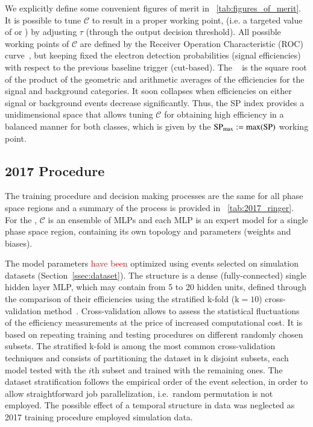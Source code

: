 We explicitly define some convenient figures of merit in \tablename~\ref{tab:figures_of_merit}. It is possible to tune $\mathcal{C}$ to result in a proper working point, (i.e. a targeted value of \pd{} or \pf{}) by adjusting $\tau$ (through the output decision threshold). All possible working points of $\mathcal{C}$ are defined by the Receiver Operation Characteristic (ROC) curve~\cite{van_trees_part1}, but keeping fixed the electron detection probabilities (signal efficiencies) with respect to the previous baseline trigger (cut-based). The \spindex{}~\cite{dos2006neural} is the square root of the product of the geometric and arithmetic averages of the efficiencies for the signal and background categories. It soon collapses when efficiencies on either signal or background events decrease significantly. Thus, the SP index provides a unidimensional space that allows tuning $\mathcal{C}$ for obtaining high efficiency in a balanced manner for both classes, which is given by the $\text{SP}_{\text{max}}{}:=\max(\text{SP}{})$ working point.









\subsection{2017 Procedure}\label{ssec:2017}

The training procedure and decision making processes are the same for all phase
space regions and a summary of the process is provided in
\tablename~\ref{tab:2017_ringer}. For the \rnn{}, $\mathcal{C}$ is an ensemble of
MLPs and each MLP is an expert model for a single phase space
region, containing its own topology and parameters (weights and biases).

The model parameters \textcolor{red}{have been} optimized using events selected on simulation datasets
(Section~\ref{ssec:dataset}). The structure is a dense (fully-connected) single
hidden layer MLP, which may contain from 5 to 20 hidden units, defined through
the comparison of their efficiencies using the stratified k-fold ($\text{k}=10$)
cross-validation method~\cite{haykin_2008}. Cross-validation allows to assess the statistical fluctuations of the efficiency measurements 
at the price of increased computational cost. It is
based on repeating training and testing procedures on different
randomly chosen subsets. The stratified k-fold is
among the most common cross-validation techniques and consists of partitioning
the dataset in k disjoint subsets, each model tested with the $i$th subset and
trained with the remaining ones. The dataset stratification follows the
empirical order of the event selection, in order to allow straightforward job
parallelization, i.e.\ random permutation is not employed. The possible effect
of a temporal structure in data was neglected as 2017 training procedure
employed simulation data.

